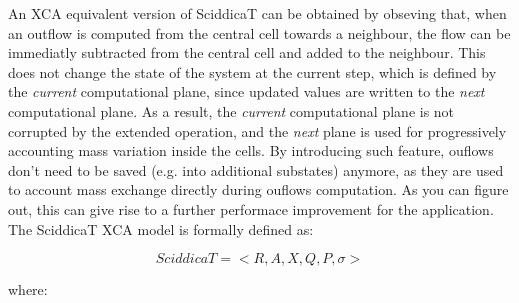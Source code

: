An XCA equivalent version of SciddicaT can be obtained by obseving
that, when an outflow is computed from the central cell towards a
neighbour, the flow can be immediatly subtracted from the central cell
and added to the neighbour. This does not change the state of the
system at the current step, which is defined by the \emph{current}
computational plane, since updated values are written to the
\emph{next} computational plane. As a result, the \emph{current}
computational plane is not corrupted by the extended operation, and
the \emph{next} plane is used for progressively accounting mass
variation inside the cells. By introducing such feature, ouflows don't
need to be saved (e.g. into additional substates) anymore, as they are
used to account mass exchange directly during ouflows computation. As
you can figure out, this can give rise to a further performace
improvement for the application. The SciddicaT XCA model is formally
defined as:


$$SciddicaT = < R, A, X, Q , P, \sigma  >$$

where:


